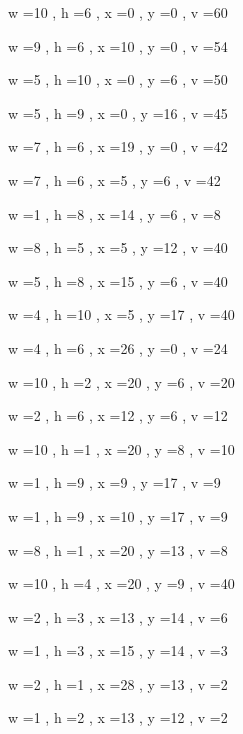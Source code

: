 \documentclass[11pt]{article}
\begin{document}
w =10 , h =6 , x =0 , y =0 , v =60
\par
w =9 , h =6 , x =10 , y =0 , v =54
\par
w =5 , h =10 , x =0 , y =6 , v =50
\par
w =5 , h =9 , x =0 , y =16 , v =45
\par
w =7 , h =6 , x =19 , y =0 , v =42
\par
w =7 , h =6 , x =5 , y =6 , v =42
\par
w =1 , h =8 , x =14 , y =6 , v =8
\par
w =8 , h =5 , x =5 , y =12 , v =40
\par
w =5 , h =8 , x =15 , y =6 , v =40
\par
w =4 , h =10 , x =5 , y =17 , v =40
\par
w =4 , h =6 , x =26 , y =0 , v =24
\par
w =10 , h =2 , x =20 , y =6 , v =20
\par
w =2 , h =6 , x =12 , y =6 , v =12
\par
w =10 , h =1 , x =20 , y =8 , v =10
\par
w =1 , h =9 , x =9 , y =17 , v =9
\par
w =1 , h =9 , x =10 , y =17 , v =9
\par
w =8 , h =1 , x =20 , y =13 , v =8
\par
w =10 , h =4 , x =20 , y =9 , v =40
\par
w =2 , h =3 , x =13 , y =14 , v =6
\par
w =1 , h =3 , x =15 , y =14 , v =3
\par
w =2 , h =1 , x =28 , y =13 , v =2
\par
w =1 , h =2 , x =13 , y =12 , v =2
\par
\newpage
\end{document}
